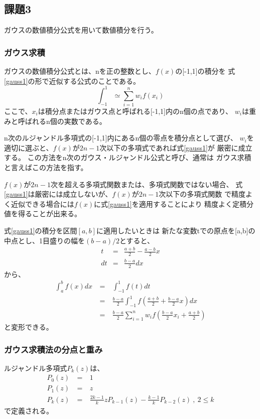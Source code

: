 \documentclass[dvipdfmx]{jsarticle}
\begin{document}
\subsection{課題3}
ガウスの数値積分公式を用いて数値積分を行う。
\subsubsection{ガウス求積}
ガウスの数値積分公式とは、nを正の整数とし、$f(x)$の[-1,1]の積分を
式\ref{gauss1}の形で近似する公式のことである。
\begin{equation}
  \int_{-1}^{1} \simeq \sum_{i=1}^{n} w_i f(x_i)
  \label{gauss1}
\end{equation}
ここで、$x_i$は積分点またはガウス点と呼ばれる[-1,1]内のn個の点であり、
$w_i$は重みと呼ばれるn個の実数である。

n次のルジャンドル多項式の[-1,1]内にあるn個の零点を積分点として選び、
$w_i$を適切に選ぶと、$f(x)$が$2n-1$次以下の多項式であれば式\ref{gauss1}が
厳密に成立する。
この方法をn次のガウス・ルジャンドル公式と呼び、通常は
ガウス求積と言えばこの方法を指す。

$f(x)$が$2n-1$次を超える多項式関数または、多項式関数ではない場合、
式\ref{gauss1}は厳密には成立しないが、$f(x)$が$2n-1$次以下の多項式関数
で精度よく近似できる場合には$f(x)$に式\ref{gauss1}を適用することにより
精度よく定積分値を得ることが出来る。

式\ref{gauss1}の積分を区間$[a,b]$に適用したいときは
新たな変数tでの原点を[a,b]の中点とし、1目盛りの幅を$(b-a)/2$とすると、
\begin{eqnarray}
  t &=& \frac{a+b}{2} - \frac{a-b}{2}x \nonumber \\
  dt &=& \frac{b-a}{2}dx \nonumber
\end{eqnarray}
から、
\begin{eqnarray}
  \int_a^b f(x)dx ~&=&~ \int_{-1}^{1} f(t)dt \nonumber\\
  &=&~ \frac{b-a}{2} \int_{-1}^{1} f(\frac{a+b}{2} + \frac{b-a}{2}x)dx \\
  &=&~ \frac{b-a}{2} \sum_{i=1}^{n} w_i f(\frac{b-a}{2}x_i + \frac{a+b}{2})
  \label{gauss2}
\end{eqnarray}
と変形できる。

\subsubsection{ガウス求積法の分点と重み}
ルジャンドル多項式$P_k(z)$は、
\begin{eqnarray}
  P_0(z) ~&=&~ 1 \nonumber\\
  P_1(z) ~&=&~ z \nonumber\\
  P_k(z) ~&=&~ \frac{2k-1}{k}zP_{k-1}(z) - \frac{k-1}{k}P_{k-2}(z) ~,~2\leq k \nonumber
\end{eqnarray}
で定義される。
\end{document}
